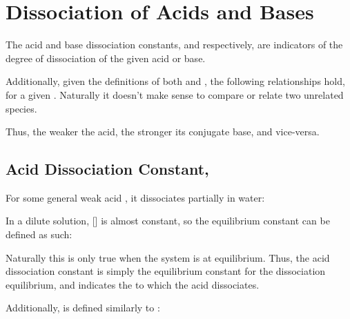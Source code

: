 


	\pagebreak
	\section{Dissociation of Acids and Bases}

		The acid and base dissociation constants, \Ka{} and \Kb{} respectively, are indicators of the degree of dissociation of the given acid
		or base.

		Additionally, given the definitions of both \Ka{} and \Kb{}, the following relationships hold, for a given
		. Naturally it doesn't make sense to compare or relate two unrelated species.


		Thus, the weaker the acid, the stronger its conjugate base, and vice-versa.


		\subsection{Acid Dissociation Constant, \texorpdfstring{\Ka{}}{Ka}}

			For some general weak acid , it dissociates partially in water:


			In a dilute solution, [] is almost constant, so the equilibrium constant can be defined as such:

			\mathdiagram{
				\[ \MKa = \frac{[\ch{H+}][\ch{A-}]}{[\ch{HA}]} \]
			}

			Naturally this is only true when the system is at equilibrium. Thus, the acid dissociation constant \Ka{} is simply the
			equilibrium constant for the dissociation equilibrium, and indicates the  to which the acid dissociates.

			Additionally, \pKa{} is defined similarly to \pKw{}:

